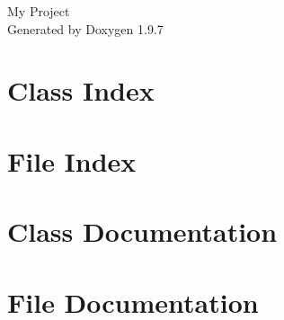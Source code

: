 \documentclass[twoside]{book}
\newcommand{\+}{\discretionary{\mbox{\scriptsize$\hookleftarrow$}}{}{}}
\newcommand{\clearemptydoublepage}{%
    \newpage{\pagestyle{empty}\cleardoublepage}%
  }
\begin{document}
  \raggedbottom
    \hypersetup{pageanchor=false,
                bookmarksnumbered=true,
                pdfencoding=unicode
               }
  \begin{titlepage}
  \vspace*{7cm}
  \begin{center}%
  {\Large My Project}\\
  \vspace*{1cm}
  {\large Generated by Doxygen 1.9.7}\\
  \end{center}
  \end{titlepage}
  \clearemptydoublepage
  \tableofcontents
  \clearemptydoublepage
  \hypersetup{pageanchor=true}

\chapter{Class Index}

\chapter{File Index}

\chapter{Class Documentation}








\chapter{File Documentation}


  \backmatter
  \newpage
  \clearemptydoublepage
  \printindex
\end{document}

